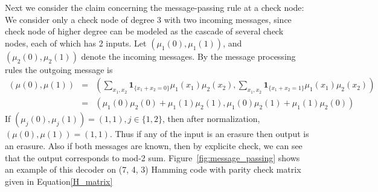 Next we consider the claim concerning the message-passing rule at a check node: We consider only a check node of degree 3 with two incoming messages, since check node of higher
degree can be modeled as the cascade of several check nodes, each of which has 2 inputs. Let $(\mu_1(0), \mu_1(1))$, and $(\mu_2(0), \mu_2(1))$ denote the incoming messages. By the
message processing rules the outgoing message is 
\begin{eqnarray}
 (\mu(0), \mu(1)) &=& \left( \sum_{x_1, x_2} \mathbf{1}_{\lbrace x_1 + x_2 = 0\rbrace}\mu_1(x_1)\mu_2(x_2), \sum_{x_1, x_2} \mathbf{1}_{\lbrace x_1 + x_2 = 1\rbrace}\mu_1(x_1)\mu_2(x_2)\right) \\
		  &=& \left( \mu_1(0)\mu_2(0) + \mu_1(1)\mu_2(1), \mu_1(0)\mu_2(1) + \mu_1(1)\mu_2(0)\right)
\end{eqnarray}
If $(\mu_j(0), \mu_j(1)) = (1, 1), j \in \lbrace 1, 2\rbrace$, then after normalization, $(\mu(0), \mu(1)) = (1, 1)$. Thus if any of the input is an erasure then output is an
erasure. Also if both messages are known, then by explicite check, we can see that the output corresponds to mod-2 sum. Figure~\ref{fig:message_passing} shows an example
of this decoder on (7, 4, 3) Hamming code with parity check matrix given in Equation\eqref{H_matrix}


